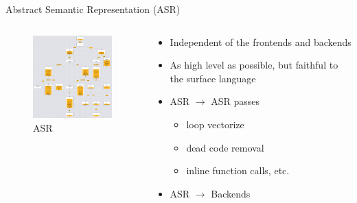 \begin{frame}{Abstract Semantic Representation (ASR)}
    \begin{columns}
        \begin{column}{0.5\textwidth}
            \begin{figure}
                \centering
                \includegraphics[width=5cm]{images/asr.png}
                \caption{ASR}
        \end{figure}
        \end{column}
        \begin{column}{0.5\textwidth}
            \begin{itemize}
                \item Independent of the frontends and backends
                \item As high level as possible, but faithful to the surface language
                \item ASR $\rightarrow$ ASR passes
                \begin{itemize}
                    \item loop vectorize
                    \item dead code removal
                    \item inline function calls, etc.
                \end{itemize}
                \item ASR $\rightarrow$ Backends
            \end{itemize}
        \end{column}
    \end{columns}
\end{frame}